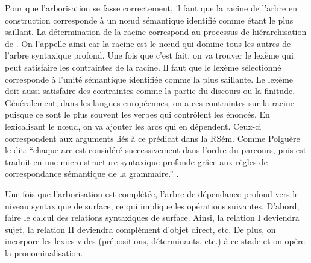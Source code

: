 Pour que l'arborisation se fasse correctement, il faut que la racine de l'arbre en construction corresponde à un n\oe{}ud sémantique identifié comme étant le plus saillant. La détermination de la racine correspond au processus de hiérarchisation de \cite{PolguereStructurationmisejeu1990}. On l'appelle ainsi car la racine est le n\oe{}ud qui domine tous les autres de l'arbre syntaxique profond. Une fois que c'est fait, on va trouver le lexème qui peut satisfaire les contraintes de la racine. Il faut que le lexème sélectionné corresponde à l'unité sémantique identifiée comme la plus saillante. Le lexème doit aussi satisfaire des contraintes comme la partie du discours ou la finitude. Généralement, dans les langues européennes, on a ces contraintes sur la racine puisque ce sont le plus souvent les verbes qui contrôlent les énoncés. En lexicalisant le n\oe{}ud, on va  ajouter les arcs qui en dépendent. Ceux-ci correspondent aux arguments liés à ce prédicat dans la RSém. Comme Polguère le dit: ``chaque arc est considéré successivement dans l'ordre du parcours, puis est traduit en une micro-structure syntaxique profonde grâce aux règles de correspondance sémantique de la grammaire.'' \citep[p.~273]{PolguereStructurationmisejeu1990}.

Une fois que l'arborisation est complétée, l'arbre de dépendance profond  vers le niveau syntaxique de surface, ce qui implique les opérations suivantes. D'abord, faire le calcul des relations syntaxiques de surface. Ainsi, la relation I deviendra sujet, la relation II deviendra complément d'objet direct, etc. De plus, on incorpore les lexies vides (prépositions, déterminants, etc.) à ce stade et on opère la pronominalisation.


